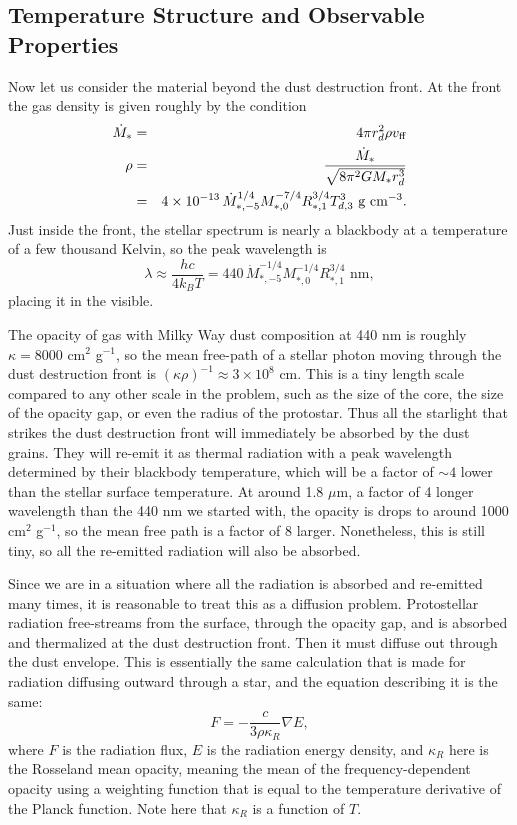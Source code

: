 \subsection{Temperature Structure and Observable Properties}

Now let us consider the material beyond the dust destruction front. At the front the gas density is given roughly by the condition
\begin{eqnarray}
\dot{M}_* & = & 4\pi r_d^2 \rho v_{\rm ff} \\
\rho & = & \frac{\dot{M}_*}{\sqrt{8 \pi^2 G M_* r_d^3}} \\
& = & 4\times 10^{-13} \, \dot{M}_{*,-5}^{1/4} M_{*,0}^{-7/4} R_{*,1}^{3/4} T_{d,3}^3\mbox{ g cm}^{-3}.
\end{eqnarray}
Just inside the front, the stellar spectrum is nearly a blackbody at a temperature of a few thousand Kelvin, so the peak wavelength is
\begin{equation}
\lambda \approx \frac{hc}{4k_BT} = 440 \, \dot{M}_{*,-5}^{-1/4} M_{*,0}^{-1/4} R_{*,1}^{3/4}\mbox{ nm},
\end{equation}
placing it in the visible.

The opacity of gas with Milky Way dust composition at 440 nm is roughly $\kappa=8000$ cm$^2$ g$^{-1}$, so the mean free-path of a stellar photon moving through the dust destruction front is $(\kappa\rho)^{-1} \approx 3\times 10^8$ cm. This is a tiny length scale compared to any other scale in the problem, such as the size of the core, the size of the opacity gap, or even the radius of the protostar. Thus all the starlight that strikes the dust destruction front will immediately be absorbed by the dust grains. They will re-emit it as thermal radiation with a peak wavelength determined by their blackbody temperature, which will be a factor of $\sim 4$ lower than the stellar surface temperature. At around 1.8 $\mu$m, a factor of 4 longer wavelength than the 440 nm we started with, the opacity is drops to around 1000 cm$^2$ g$^{-1}$, so the mean free path is a factor of 8 larger. Nonetheless, this is still tiny, so all the re-emitted radiation will also be absorbed.

Since we are in a situation where all the radiation is absorbed and re-emitted many times, it is reasonable to treat this as a diffusion problem. Protostellar radiation free-streams from the surface, through the opacity gap, and is absorbed and thermalized at the dust destruction front. Then it must diffuse out through the dust envelope. This is essentially the same calculation that is made for radiation diffusing outward through a star, and the equation describing it is the same:
\begin{equation}
F = -\frac{c}{3\rho \kappa_R} \nabla E,
\end{equation}
where $F$ is the radiation flux, $E$ is the radiation energy density, and $\kappa_R$ here is the Rosseland mean opacity, meaning the mean of the frequency-dependent opacity using a weighting function that is equal to the temperature derivative of the Planck function. Note here that $\kappa_R$ is a function of $T$.

